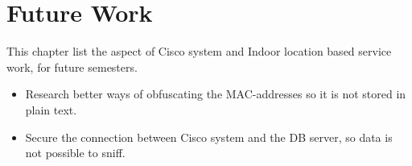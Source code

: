 \chapter{Future Work}
\label{Cha:Future_Work}
This chapter list the aspect of Cisco system and Indoor location based service work, for future semesters.

\begin{itemize}
	\item Research better ways of obfuscating the MAC-addresses so it is not stored in plain text.
	\item Secure the connection between Cisco system and the DB server, so data is not possible to sniff.
\end{itemize}
